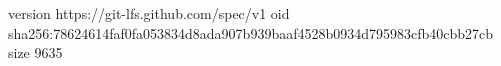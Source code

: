 version https://git-lfs.github.com/spec/v1
oid sha256:78624614faf0fa053834d8ada907b939baaf4528b0934d795983cfb40cbb27cb
size 9635
